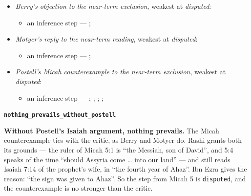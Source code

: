 \documentclass[11pt]{article}
\begin{document}
\begin{itemize}
\begin{itemize}
\item Mary conceived Jesus while a virgin --- Matt 1:18-25; Luke 1:26-38; \cite[30--33]{brown-problem-virginal-conception-1972}
\item an inference step --- \cite[ad loc. Isa 7:14]{motyer-isaiah-1993}
\item an inference step --- \cite{miravalle-meet-your-mother-2014}
\item an inference step --- \cite{miravalle-introduction-mary-2020}
\item an inference step --- \cite[490--493]{postell-isaiah-messianic-2025}
\item an inference step --- \cite[ad loc. Matt 1:23]{france-matthew-2007}
\end{itemize}
\item \emph{Berry’s objection to the near-term exclusion}, weakest at \emph{disputed}:
\begin{itemize}
\item an inference step --- \cite[1653--1654]{berry-virgin-birth-2003}; \cite[5]{compton-immanuel-prophecy-2007}
\end{itemize}
\item \emph{Motyer’s reply to the near-term reading}, weakest at \emph{disputed}:
\begin{itemize}
\item an inference step --- \cite[124]{motyer-context-content-1970}; \cite[5]{compton-immanuel-prophecy-2007}
\end{itemize}
\item \emph{Postell’s Micah counterexample to the near-term exclusion}, weakest at \emph{disputed}:
\begin{itemize}
\item an inference step --- \cite[481]{postell-isaiah-messianic-2025}; \cite[ad loc. Mic 5:1]{rashi-commentary-prophets-1100}; \cite[ad loc. Mic 5:4]{rashi-commentary-prophets-1100}; \cite[ad loc. Isa 7:14]{rashi-commentary-prophets-1100}; \cite[ad loc. Isa 7:14]{ibn-ezra-commentary-isaiah-1145}
\end{itemize}
\end{itemize}
\par\medskip\noindent\textbf{\texttt{nothing\_\allowbreak{}prevails\_\allowbreak{}without\_\allowbreak{}postell}}\par\nobreak\noindent
\textbf{Without Postell’s Isaiah argument, nothing prevails.} The Micah counterexample ties with the critic, as Berry and Motyer do. Rashi grants both its grounds — the ruler of Micah 5:1 is “the Messiah, son of David”, and 5:4 speaks of the time “should Assyria come … into our land” — and still reads Isaiah 7:14 of the prophet’s wife, in “the fourth year of Ahaz”. Ibn Ezra gives the reason: “the sign was given to Ahaz”. So the step from Micah 5 is \texttt{disputed}, and the counterexample is no stronger than the critic.
\end{document}
